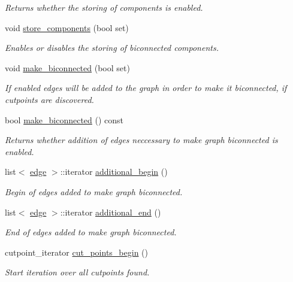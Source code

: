 \begin{DoxyCompactItemize}
\begin{DoxyCompactList}\small\item\em Returns whether the storing of components is enabled. \end{DoxyCompactList}\item 
void \mbox{\hyperlink{classbiconnectivity_ab7c9e256a4d7a4ffea33b20f014e1f69}{store\+\_\+components}} (bool set)
\begin{DoxyCompactList}\small\item\em Enables or disables the storing of biconnected components. \end{DoxyCompactList}\item 
void \mbox{\hyperlink{classbiconnectivity_a774fd08203a6d164605afc4cdc8b9201}{make\+\_\+biconnected}} (bool set)
\begin{DoxyCompactList}\small\item\em If enabled edges will be added to the graph in order to make it biconnected, if cutpoints are discovered. \end{DoxyCompactList}\item 
bool \mbox{\hyperlink{classbiconnectivity_a9ca9632a7fc398edb5b505dd0fe706c9}{make\+\_\+biconnected}} () const
\begin{DoxyCompactList}\small\item\em Returns whether addition of edges neccessary to make graph biconnected is enabled. \end{DoxyCompactList}\item 
list$<$ \mbox{\hyperlink{classedge}{edge}} $>$\+::iterator \mbox{\hyperlink{classbiconnectivity_ac5295da180114bffbbfd621d644d4c58}{additional\+\_\+begin}} ()
\begin{DoxyCompactList}\small\item\em Begin of edges added to make graph biconnected. \end{DoxyCompactList}\item 
list$<$ \mbox{\hyperlink{classedge}{edge}} $>$\+::iterator \mbox{\hyperlink{classbiconnectivity_a447a86f387efd181b25b8bacf3365e75}{additional\+\_\+end}} ()
\begin{DoxyCompactList}\small\item\em End of edges added to make graph biconnected. \end{DoxyCompactList}\item 
cutpoint\+\_\+iterator \mbox{\hyperlink{classbiconnectivity_a473197552874aaf148e847838144eed7}{cut\+\_\+points\+\_\+begin}} ()
\begin{DoxyCompactList}\small\item\em Start iteration over all cutpoints found. \end{DoxyCompactList}\item 

\end{DoxyCompactItemize}

